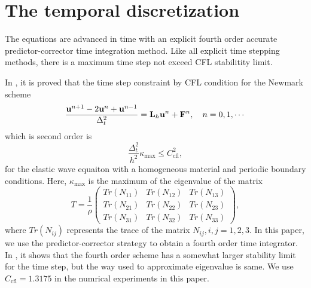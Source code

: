 \section{The temporal discretization}
The equations are advanced in time with an explicit fourth order accurate predictor-corrector time integration method. Like all explicit time stepping methods, there is a maximum time step not exceed CFL stabilitity limit.

In \cite{petersson2015wave}, it is proved that the time step constraint by CFL condition for the Newmark scheme 
\begin{equation*}
\frac{{\bf u}^{n+1}-2{\bf u}^n + {\bf u}^{n-1}}{\Delta_t^2} = {\bf L}_h{\bf u}^n + {\bf F}^n, \ \ \ n = 0,1,\cdots
\end{equation*}
which is second order is
\begin{equation*}
\frac{\Delta_t^2}{h^2}\kappa_{\text{max}}\leq C_{\text{cfl}}^2,
\end{equation*}
for the elastic wave equaiton with a homogeneous material and periodic boundary conditions. Here, 
$\kappa_{\text{max}}$ is the maximum of the eigenvalue of the matrix 
\[T = \frac{1}{\rho}\left(\begin{array}{ccc}
Tr(N_{11}) &  Tr(N_{12})& Tr(N_{13})\\
Tr(N_{21}) & Tr(N_{22}) & Tr(N_{23})\\
Tr(N_{31}) & Tr(N_{32}) & Tr(N_{33})\end{array}\right), \]
where $Tr(N_{ij})$ represents the trace of the matrix $N_{ij},i,j = 1,2,3$. In this paper, we use the predictor-corrector strategy to obtain a fourth order time integrator. In \cite{sjogreen2012fourth}, it shows that the fourth order scheme has a somewhat larger stability limit for the time step, but the way used to approximate eigenvalue is same. We use $C_{\text{cfl}} = 1.3175$ in the numrical experiments in this paper.